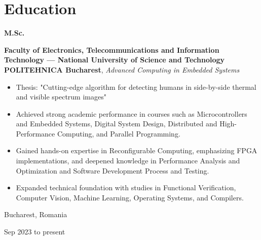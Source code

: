 \documentclass[10pt, a4paper]{article}
\newenvironment{highlights}{
    \begin{itemize}[
        topsep=0.1 cm,
        parsep=0.1 cm,
        partopsep=0pt,
        itemsep=0pt,
        leftmargin=0 cm + 10pt
    ]
}{
    \end{itemize}
} %
\newenvironment{threecolentry}[3][]{
    \onecolentry
    \def\thirdColumn{#3}
    \setcolumnwidth{1 cm, \fill, 3.5 cm}
    \begin{paracol}{3}
    {\raggedright #2} \switchcolumn
}{
    \switchcolumn \raggedleft \thirdColumn
    \end{paracol}
    \endonecolentry
} %
\begin{document}
    
    \section{Education}



        
        \begin{threecolentry}{\textbf{M.Sc.}}{
            Bucharest, Romania

        Sep 2023 to present
        }
            \textbf{Faculty of Electronics, Telecommunications and Information Technology — National University of Science and Technology POLITEHNICA Bucharest}, \textit{Advanced Computing in Embedded Systems}
            \begin{highlights}
                \item Thesis: "Cutting-edge algorithm for detecting humans in side-by-side thermal and visible spectrum images"
                \item Achieved strong academic performance in courses such as Microcontrollers and Embedded Systems, Digital System Design, Distributed and High-Performance Computing, and Parallel Programming.
                \item Gained hands-on expertise in Reconfigurable Computing, emphasizing FPGA implementations, and deepened knowledge in Performance Analysis and Optimization and Software Development Process and Testing.
                \item Expanded technical foundation with studies in Functional Verification, Computer Vision, Machine Learning, Operating Systems, and Compilers.
            \end{highlights}
        \end{threecolentry}

        \vspace{0.2 cm}
\end{document}
